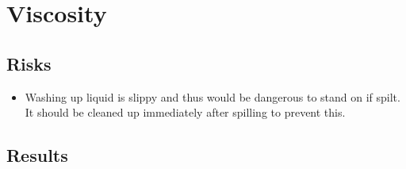 \documentclass{article}
\begin{document}
\section{Viscosity}

\subsection{Risks}

\begin{itemize}
	\item Washing up liquid is slippy and thus would be dangerous to stand on if spilt. It should be
	cleaned up immediately after spilling to prevent this.
\end{itemize}

\subsection{Results}
\end{document}
